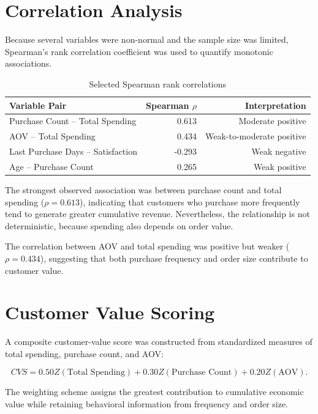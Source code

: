 \documentclass[11pt,a4paper]{article}
\begin{document}
\section{Correlation Analysis}

Because several variables were non-normal and the sample size was limited,
Spearman's rank correlation coefficient was used to quantify monotonic
associations.

\begin{table}[H]
\centering
\caption{Selected Spearman rank correlations}
\label{tab:corr}
\begin{tabular}{lrr}
\toprule
Variable Pair & Spearman $\rho$ & Interpretation \\
\midrule
Purchase Count -- Total Spending & 0.613 & Moderate positive \\
AOV -- Total Spending & 0.434 & Weak-to-moderate positive \\
Last Purchase Days -- Satisfaction & -0.293 & Weak negative \\
Age -- Purchase Count & 0.265 & Weak positive \\
\bottomrule
\end{tabular}
\end{table}

The strongest observed association was between purchase count and total
spending ($\rho=0.613$), indicating that customers who purchase more
frequently tend to generate greater cumulative revenue. Nevertheless,
the relationship is not deterministic, because spending also depends on
order value.

The correlation between AOV and total spending was positive but weaker
($\rho=0.434$), suggesting that both purchase frequency and order size
contribute to customer value.

\section{Customer Value Scoring}

A composite customer-value score was constructed from standardized
measures of total spending, purchase count, and AOV:

\begin{equation}
CVS =
0.50Z(\text{Total Spending})
+0.30Z(\text{Purchase Count})
+0.20Z(\text{AOV}).
\end{equation}

The weighting scheme assigns the greatest contribution to cumulative
economic value while retaining behavioral information from frequency and
order size.
\end{document}
